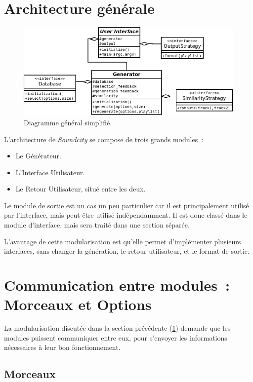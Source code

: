 \section{Architecture générale}
\label{archi:general}

\begin{figure}[H]
\includegraphics[width=\textwidth]{data/archi/general.png}
\caption{Diagramme général simplifié.}
\end{figure}

L'architecture de \emph{Soundcity} se compose de trois grands modules~:
\begin{itemize}
  \item Le Générateur.
  \item L'Interface Utilisateur.
  \item Le Retour Utilisateur, situé entre les deux.
\end{itemize}

Le module de sortie est un cas un peu particulier car il est principalement
utilisé par l'interface, mais peut être utilisé indépendamment. Il est donc
classé dans le module d'interface, mais sera traité dans une section séparée.

L'avantage de cette modularisation est qu'elle permet d'implémenter plusieurs
interfaces, sans changer la génération, le retour utilisateur, et le format de
sortie.

\section{Communication entre modules~: Morceaux et Options}
\label{archi:communication}

La modularisation discutée dans la section précédente (\ref{archi:general})
demande que les modules puissent communiquer entre eux, pour s'envoyer les
informations nécessaires à leur bon fonctionnement.

\subsection{Morceaux}
\label{archi:communication:track}

